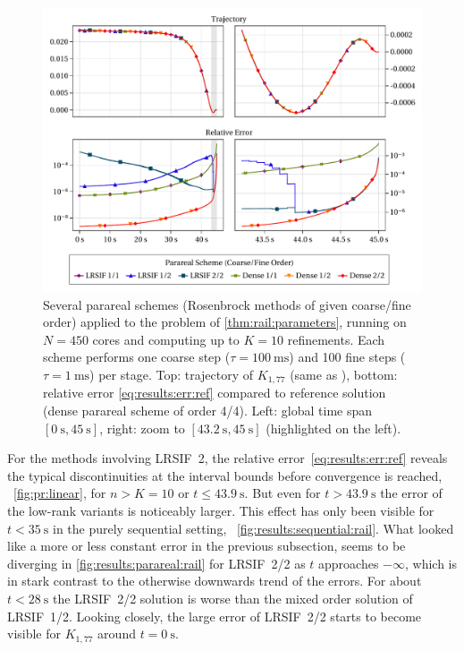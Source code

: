 \begin{figure}[tp]
  \centering
  \includegraphics[width=\textwidth]{figures/fig_results_parareal.pdf}
  \caption[Parareal method applied to Rail problem]{%
    Several parareal schemes (Rosenbrock methods of given coarse/fine order)
    applied to the problem of \autoref{thm:rail:parameters},
    running on $N=450$ cores and
    computing up to $K=10$ refinements.
    Each scheme performs
    one coarse step ($\tau=\SI{100}{\milli\second}$) and
    100 fine steps ($\tau=\SI{1}{\milli\second}$) per stage.
    Top: trajectory of $K_{1,77}$ (same as \cite[Fig.~1]{Lang2015}),
    bottom: relative error \eqref{eq:results:err:ref} compared to reference solution
    (dense parareal scheme of order 4/4).
    Left: global time span $[\SI{0}{\second}, \SI{45}{\second}]$,
    right: zoom to $[\SI[round-mode=off]{43.2}{\second}, \SI{45}{\second}]$ (highlighted on the left).
  }
  \label{fig:results:parareal:rail}
\end{figure}

For the methods involving \ac{LRSIF}~2,
the relative error~\eqref{eq:results:err:ref} reveals
the typical discontinuities at the interval bounds
before convergence is reached,
\cf~\autoref{fig:pr:linear},
for $n > K = 10$ or $t \leq \SI[round-precision=1]{43.9}{\second}$.
But even for $t > \SI[round-precision=1]{43.9}{\second}$ the error of the low-rank variants is noticeably larger.
This effect has only been visible for $t < \SI{35}{\second}$ in the purely sequential setting,
\cf~\autoref{fig:results:sequential:rail}.
What looked like a more or less constant error in the previous subsection,
seems to be diverging in \autoref{fig:results:parareal:rail} for \ac{LRSIF}~2/2 as $t$ approaches $-\infty$,
which is in stark contrast to the otherwise downwards trend of the errors.
For about $t < \SI{28}{\second}$ the \ac{LRSIF}~2/2 solution is worse than the mixed order solution of \ac{LRSIF}~1/2.
Looking closely, the large error of \ac{LRSIF}~2/2 starts to become visible for $K_{1,77}$ around $t=\SI{0}{\second}$.


